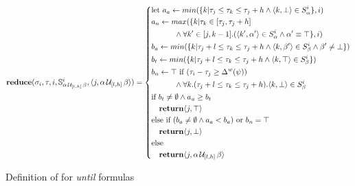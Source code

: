 \begin{figure}
\tiny
\begin{align*}
\mathbf{reduce}(\sigma_i,\tau, i,\mathbb{S}^i_{\alpha\, \mathcal{U}_{[l,h]}\, \beta} ,\langle j, \alpha\, \mathcal{U}_{[l,h]}\, \beta \rangle) = \left\{
\begin{aligned}
&\text{let } a_a \leftarrow min(\{k | \tau_j \leq \tau_k \leq \tau_j+h  \wedge \langle k, \bot \rangle \in S^i_\alpha \},i) \\ 
& a_u \leftarrow max(\{k| \tau_k \in [\tau_j,\tau_j+h] \\
& \quad \quad \quad \wedge \forall k' \in [j,k-1].(\langle k', \alpha' \rangle \in S^i_\alpha \wedge \alpha' \equiv \top\},i) \\
& b_a \leftarrow min(\{k | \tau_j+l \leq \tau_k \leq \tau_j+h \wedge \langle k, \beta' \rangle \in S^i_\beta \wedge \beta' \neq \bot\}) \\ 
&b_t \leftarrow min(\{k | \tau_j+l \leq \tau_k \leq \tau_j+h \wedge \langle k, \top \rangle \in S^i_{\beta} \}) \\
&b_n \leftarrow \top \text{ if } (\tau_i - \tau_j \geq \Delta^w(\psi)) \\
& \quad \quad \quad \wedge \forall k.(\tau_j+l \leq \tau_k \leq \tau_j+h). \langle k, \bot \rangle \in S^i_{\beta} \\
&\text{if } b_t \neq \emptyset \wedge a_u \geq b_t \\
& \quad\mathbf{return} \langle j, \top \rangle \\
&\text{else if } (b_a \neq \emptyset \wedge a_a < b_a) \text{ or } b_n = \top\\ & \quad\mathbf{return} \langle j, \bot \rangle \\
&\text{else} \\
& \quad\mathbf{return} \langle j, \alpha\, \mathcal{U}_{[l,h]}\, \beta \rangle
\end{aligned} \right. \\
\end{align*}
\normalsize
\caption{Definition of \reduce for \emph{until} formulas \label{fig:until}}
\end{figure}

